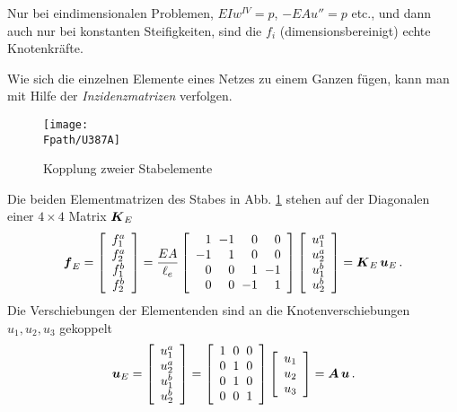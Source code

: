 Nur bei eindimensionalen Problemen, $EI w^{IV} = p$, $-EA u'' =  p$ etc., und dann auch nur bei konstanten Steifigkeiten, sind die $f_i$ (dimensionsbereinigt) echte Knotenkr\"{a}fte.


Wie sich die einzelnen Elemente eines Netzes zu einem Ganzen f\"{u}gen, kann man mit Hilfe der {\em Inzidenzmatrizen\/} verfolgen.

\begin{figure}[tbp]
\centering
\texttt{[image: \\Fpath/U387A]}
\caption{Kopplung zweier Stabelemente }
\label{U387}
\end{figure}%

Die beiden Elementmatrizen des Stabes in Abb. \ref{U387} stehen auf der Diagonalen einer $4 \times 4$ Matrix $\mbox{\boldmath $K$}_E$
\begin{align}
\vek f_E = \left[ \barr{c} f_1^a \\ f_2^a \\ f_1^b \\ f_2^b \earr \right] =  \frac{EA}{\ell_e} \left [
\barr {r @{\hspace{2mm}} r @{\hspace{2mm}} r @{\hspace{2mm}} r} 1 & -1 & 0 & 0 \\ -1 & 1 & 0 & 0 \\ 0 & 0 & 1 & -1 \\ 0 & 0 & -1 & 1 \\ \earr \right] \left[ \barr{cc} u_1^a \\ u_2^a \\ u_1^b \\ u_2^b \earr \right] = \vek K_E\,\vek u_E\,.
\end{align}
Die Verschiebungen der Elementenden sind an die Knotenverschiebungen $u_1, u_2, u_3$ gekoppelt
\begin{align}
\vek u_E = \left[ \barr{c} u_1^a \\ u_2^a \\ u_1^b \\ u_2^b \earr \right] = \left [
\barr {r @{\hspace{2mm}} r @{\hspace{2mm}} r } 1 & 0 & 0  \\ 0 & 1 & 0 \\ 0 & 1 & 0 \\ 0 & 0 &  1 \\ \earr \right] \left[ \barr{cc} u_1 \\ u_2 \\ u_3 \earr \right] = \vek  A\,\vek u\,.
\end{align}
